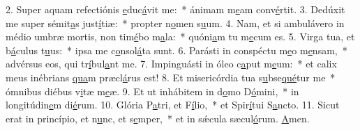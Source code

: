 2. Super aquam refectiónis \uline{e}duc\uline{á}vit me:~* ánimam m\uline{e}am conv\uline{é}rtit.
3. Dedúxit me super sémit\uline{a}s just\uline{í}tiæ:~* propter n\uline{o}men s\uline{u}um.
4. Nam, et si ambulávero in médio umbræ mortis, non tim\uline{é}bo m\uline{a}la:~* quóni\uline{a}m tu m\uline{e}cum es.
5. Virga tua, et b\uline{á}culus t\uline{u}us:~* ipsa me c\uline{o}nsol\uline{á}ta sunt.
6. Parásti in conspéctu m\uline{e}o m\uline{e}nsam,~* advérsus eos, qui tr\uline{í}bul\uline{a}nt me.
7. Impinguásti in óleo c\uline{a}put m\uline{e}um:~* et calix meus inébrians \uline{qua}m præcl\uline{á}rus est!
8. Et misericórdia tua s\uline{u}bse\uline{qué}tur me~* ómnibus diébus v\uline{i}tæ m\uline{e}æ.
9. Et ut inhábitem in d\uline{o}mo D\uline{ó}mini,~* in longitúdin\uline{e}m di\uline{é}rum.
10. Glória P\uline{a}tri, et F\uline{í}lio,~* et Spir\uline{í}tui S\uline{a}ncto.
11. Sicut erat in princípio, et n\uline{u}nc, et s\uline{e}mper,~* et in sǽcula sæcul\uline{ó}rum. \uline{A}men.
